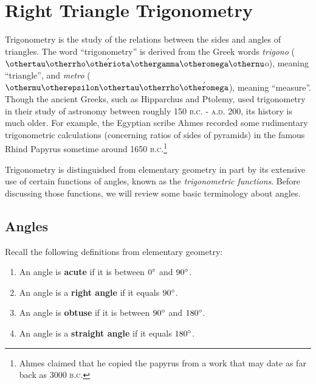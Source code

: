 \chapter{Right Triangle Trigonometry}
Trigonometry is the study of the relations between the sides and angles of triangles. The word
``trigonometry'' is derived from the Greek words \emph{trigono}
($\othertau\otherrho\acute{\otheriota}\othergamma\otheromega\othernu$o), meaning ``triangle'', and \emph{metro}
($\othermu\otherepsilon\othertau\otherrho\acute{\otheromega}$), meaning ``measure''. Though the ancient Greeks,
such as Hipparchus and Ptolemy, used trigonometry in their study of
astronomy between roughly 150 \textsc{b.c.} - \textsc{a.d.} 200, its history is much older.
For example, the Egyptian scribe Ahmes recorded some rudimentary
trigonometric calculations (concerning ratios of sides of pyramids) in the famous Rhind
Papyrus sometime around 1650 \textsc{b.c.}\footnote{Ahmes claimed that he
copied the papyrus from a work that may date as far back as 3000 \textsc{b.c.}}

Trigonometry is distinguished from elementary geometry in part by its extensive use of certain
functions of angles, known as the \emph{trigonometric functions}. Before discussing those functions,
we will review some basic terminology about angles.

\section{Angles}
Recall the following definitions from elementary geometry:
\begin{enumerate}[\bfseries (a)]
 \item An angle is \textbf{acute} if it is between $0^\circ$
  and $90^\circ$.
 \item An angle is a \textbf{right angle} if it equals
  $90^\circ$.
 \item An angle is \textbf{obtuse} if it is between
  $90^\circ$ and $180^\circ$.
 \item An angle is a \textbf{straight angle} if it
  equals $180^\circ$.
\end{enumerate}

